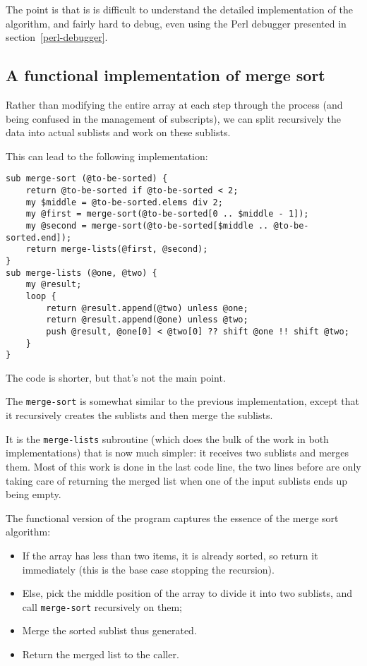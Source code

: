 The point is that is is difficult to understand the detailed 
implementation of the algorithm, and fairly hard to debug, even 
using the Perl debugger presented in section~\ref{perl-debugger}.

\subsection{A functional implementation of merge sort}
Rather than modifying the entire array at each step through 
the process (and being confused in the management of subscripts), 
we can split recursively the data into actual sublists and work 
on these sublists.

This can lead to the following implementation:

\begin{verbatim}
sub merge-sort (@to-be-sorted) {
    return @to-be-sorted if @to-be-sorted < 2;
    my $middle = @to-be-sorted.elems div 2;
    my @first = merge-sort(@to-be-sorted[0 .. $middle - 1]);
    my @second = merge-sort(@to-be-sorted[$middle .. @to-be-sorted.end]);
    return merge-lists(@first, @second);
}
sub merge-lists (@one, @two) {
    my @result;
    loop {
        return @result.append(@two) unless @one;
        return @result.append(@one) unless @two;
        push @result, @one[0] < @two[0] ?? shift @one !! shift @two;
    }
} 
\end{verbatim}

The code is shorter, but that's not the main point.

The {\tt merge-sort} is somewhat similar to the previous 
implementation, except that it recursively creates the 
sublists and then merge the sublists.

It is the {\tt merge-lists} subroutine (which does the bulk 
of the work in both implementations) that is now much 
simpler: it receives two sublists and merges them. Most of this 
work is done in the last code line, the two lines before 
are only taking care of returning the merged list when one 
of the input sublists ends up being empty.

The functional version of the program captures  
the essence of the merge sort algorithm:
\begin{itemize}
\item If the  array has less than two items, it is already 
sorted, so return it immediately (this is the base case 
stopping the recursion).
\item Else, pick the middle position of the array to divide 
it into two sublists, and call \verb'merge-sort' recursively 
on them;
\item Merge the sorted sublist thus generated.
\item Return the merged list to the caller.
\end{itemize}

